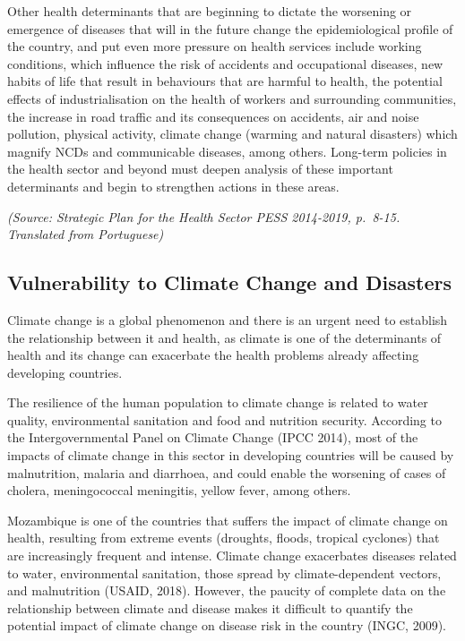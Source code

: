 \documentclass[
]{book}
\begin{document}
Other health determinants that are beginning to dictate the worsening or emergence of diseases that will in the future change the epidemiological profile of the country, and put even more pressure on health services include working conditions, which influence the risk of accidents and occupational diseases, new habits of life that result in behaviours that are harmful to health, the potential effects of industrialisation on the health of workers and surrounding communities, the increase in road traffic and its consequences on accidents, air and noise pollution, physical activity, climate change (warming and natural disasters) which magnify NCDs and communicable diseases, among others. Long-term policies in the health sector and beyond must deepen analysis of these important determinants and begin to strengthen actions in these areas.

\emph{(Source: Strategic Plan for the Health Sector PESS 2014-2019, p.~8-15. Translated from Portuguese)}

\hypertarget{vulnerability-to-climate-change-and-disasters-4}{%
\subsection{Vulnerability to Climate Change and Disasters}\label{vulnerability-to-climate-change-and-disasters-4}}

Climate change is a global phenomenon and there is an urgent need to establish the relationship between it and health, as climate is one of the determinants of health and its change can exacerbate the health problems already affecting developing countries.

The resilience of the human population to climate change is related to water quality, environmental sanitation and food and nutrition security. According to the Intergovernmental Panel on Climate Change (IPCC 2014), most of the impacts of climate change in this sector in developing countries will be caused by malnutrition, malaria and diarrhoea, and could enable the worsening of cases of cholera, meningococcal meningitis, yellow fever, among others.

Mozambique is one of the countries that suffers the impact of climate change on health, resulting from extreme events (droughts, floods, tropical cyclones) that are increasingly frequent and intense. Climate change exacerbates diseases related to water, environmental sanitation, those spread by climate-dependent vectors, and malnutrition (USAID, 2018). However, the paucity of complete data on the relationship between climate and disease makes it difficult to quantify the potential impact of climate change on disease risk in the country (INGC, 2009).
\end{document}
